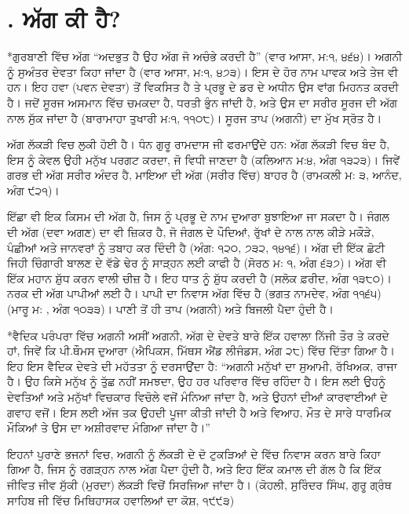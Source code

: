 \documentclass[12pt,a5paper,twoside]{book}  %
\makeatletter
\renewcommand\section{\@startsection{section}{1}{0pt}{1.2em}{0.6em}{\punjabifont\Large\bfseries}}%
\DeclareRobustCommand{\eng}[1]{{\rmfamily #1}}
\makeatother
\begin{document}
{\chapter*{\eng{3.} ਅੱਗ ਕੀ ਹੈ?}
\addcontentsline{toc}{chapter}{\eng{3.} ਅੱਗ ਕੀ ਹੈ?}
\section*{ਗੁਰਬਾਣੀ ਵਿੱਚ ਅੱਗ}
“ਅਦਭੁਤ ਹੈ ਉਹ ਅੱਗ ਜੋ ਅਚੰਭੇ ਕਰਦੀ ਹੈ” (ਵਾਰ ਆਸਾ, ਮ:੧, ੪੬੪)। ਅਗਨੀ ਨੂੰ ਸੁਅੰਤਰ ਦੇਵਤਾ ਕਿਹਾ ਜਾਂਦਾ ਹੈ (ਵਾਰ ਆਸਾ, ਮ:੧, ੪੭੩)। ਇਸ ਦੇ ਹੋਰ ਨਾਮ ਪਾਵਕ ਅਤੇ ਤੇਜ ਵੀ ਹਨ। ਇਹ ਹਵਾ (ਪਵਨ ਦੇਵਤਾ) ਤੋਂ ਵਿਕਸਿਤ ਹੈ ਤੇ ਪ੍ਰਭੂ ਦੇ ਡਰ ਦੇ ਅਧੀਨ ਉਸ ਵਾਂਗ ਮਿਹਨਤ ਕਰਦੀ ਹੈ। ਜਦੋਂ ਸੂਰਜ ਅਸਮਾਨ ਵਿੱਚ ਚਮਕਦਾ ਹੈ, ਧਰਤੀ ਭੁੰਨ ਜਾਂਦੀ ਹੈ, ਅਤੇ ਉਸ ਦਾ ਸਰੀਰ ਸੂਰਜ ਦੀ ਅੱਗ ਨਾਲ ਸੁੱਕ ਜਾਂਦਾ ਹੈ (ਬਾਰਾਮਾਹਾ ਤੁਖਾਰੀ ਮ:੧, ੧੧੦੮)। ਸੂਰਜ ਤਾਪ (ਅਗਨੀ) ਦਾ ਮੁੱਖ ਸ੍ਰੋਤ ਹੈ।

ਅੱਗ ਲੱਕੜੀ ਵਿਚ ਲੁਕੀ ਹੋਈ ਹੈ। ਧੰਨ ਗੁਰੂ ਰਾਮਦਾਸ ਜੀ ਫਰਮਾਉਂਦੇ ਹਨ: ਅੱਗ ਲੱਕੜੀ ਵਿਚ ਬੰਦ ਹੈ, ਇਸ ਨੂੰ ਕੇਵਲ ਉਹੀ ਮਨੁੱਖ ਪਰਗਟ ਕਰਦਾ, ਜੋ ਵਿਧੀ ਜਾਣਦਾ ਹੈ (ਕਲਿਆਨ ਮ:੪, ਅੰਗ ੧੩੨੩)। ਜਿਵੇਂ ਗਰਭ ਦੀ ਅੱਗ ਸਰੀਰ ਅੰਦਰ ਹੈ, ਮਾਇਆ ਦੀ ਅੱਗ (ਸਰੀਰ ਵਿੱਚ) ਬਾਹਰ ਹੈ (ਰਾਮਕਲੀ ਮ: ੩, ਆਨੰਦ, ਅੰਗ ੯੨੧)।

ਇੱਛਾ ਵੀ ਇਕ ਕਿਸਮ ਦੀ ਅੱਗ ਹੈ, ਜਿਸ ਨੂੰ ਪ੍ਰਭੂ ਦੇ ਨਾਮ ਦੁਆਰਾ ਬੁਝਾਇਆ ਜਾ ਸਕਦਾ ਹੈ। ਜੰਗਲ ਦੀ ਅੱਗ (ਦਵਾ ਅਗਣ) ਦਾ ਵੀ ਜ਼ਿਕਰ ਹੈ, ਜੋ ਜੰਗਲ ਦੇ ਪੌਦਿਆਂ, ਰੁੱਖਾਂ ਦੇ ਨਾਲ ਨਾਲ ਕੀੜੇ ਮਕੌੜੇ, ਪੰਛੀਆਂ ਅਤੇ ਜਾਨਵਰਾਂ ਨੂੰ ਤਬਾਹ ਕਰ ਦਿੰਦੀ ਹੈ (ਅੰਗ: ੧੨੦, ੭੩੨, ੧੪੧੬)। ਅੱਗ ਦੀ ਇੱਕ ਛੋਟੀ ਜਿਹੀ ਚਿੰਗਾਰੀ ਬਾਲਣ ਦੇ ਵੱਡੇ ਢੇਰ ਨੂੰ ਸਾੜ੍ਹਨ ਲਈ ਕਾਫੀ ਹੈ (ਸੋਰਠ ਮ: ੧, ਅੰਗ ੬੩੭)। ਅੱਗ ਵੀ ਇੱਕ ਮਹਾਨ ਸ਼ੁੱਧ ਕਰਨ ਵਾਲੀ ਚੀਜ਼ ਹੈ। ਇਹ ਧਾਤ ਨੂੰ ਸ਼ੁੱਧ ਕਰਦੀ ਹੈ (ਸਲੋਕ ਫ਼ਰੀਦ, ਅੰਗ ੧੩੮੦)। ਨਰਕ ਦੀ ਅੱਗ ਪਾਪੀਆਂ ਲਈ ਹੈ। ਪਾਪੀ ਦਾ ਨਿਵਾਸ ਅੱਗ ਵਿੱਚ ਹੈ (ਭਗਤ ਨਾਮਦੇਵ, ਅੰਗ ੧੧੬੫) (ਮਾਰੂ ਮ: \eng{1}, ਅੰਗ ੧੦੩੩)। ਪਾਣੀ ਤੋਂ ਹੀ ਤਾਪ (ਅਗਨੀ) ਅਤੇ ਬਿਜਲੀ ਪੈਦਾ ਹੁੰਦੀ ਹੈ।

\section*{ਵੈਦਿਕ ਪਰੰਪਰਾ ਵਿੱਚ ਅਗਨੀ}
ਅਸੀਂ ਅਗਨੀ, ਅੱਗ ਦੇ ਦੇਵਤੇ ਬਾਰੇ ਇੱਕ ਹਵਾਲਾ ਨਿੱਜੀ ਤੌਰ ਤੇ ਕਰਦੇ ਹਾਂ, ਜਿਵੇਂ ਕਿ ਪੀ.ਥੌਮਸ ਦੁਆਰਾ (ਐਪਿਕਸ, ਮਿੱਥਸ ਐਂਡ ਲੀਜੰਡਸ, ਅੰਗ ੨੮) ਵਿੱਚ ਦਿੱਤਾ ਗਿਆ ਹੈ। ਇਹ ਇਸ ਵੈਦਿਕ ਦੇਵਤੇ ਦੀ ਮਹੱਤਤਾ ਨੂੰ ਦਰਸਾਉਂਦਾ ਹੈ: “ਅਗਨੀ ਮਨੁੱਖਾਂ ਦਾ ਸੁਆਮੀ, ਰੱਖਿਅਕ, ਰਾਜਾ ਹੈ। ਉਹ ਕਿਸੇ ਮਨੁੱਖ ਨੂੰ ਤੁੱਛ ਨਹੀਂ ਸਮਝਦਾ, ਉਹ ਹਰ ਪਰਿਵਾਰ ਵਿੱਚ ਰਹਿੰਦਾ ਹੈ। ਇਸ ਲਈ ਉਹਨੂੰ ਦੇਵਤਿਆਂ ਅਤੇ ਮਨੁੱਖਾਂ ਵਿਚਕਾਰ ਵਿਚੋਲੇ ਵਜੋਂ ਮੰਨਿਆ ਜਾਂਦਾ ਹੈ, ਅਤੇ ਉਹਨਾਂ ਦੀਆਂ ਕਾਰਵਾਈਆਂ ਦੇ ਗਵਾਹ ਵਜੋਂ। ਇਸ ਲਈ ਅੱਜ ਤਕ ਉਹਦੀ ਪੂਜਾ ਕੀਤੀ ਜਾਂਦੀ ਹੈ ਅਤੇ ਵਿਆਹ, ਮੌਤ ਦੇ ਸਾਰੇ ਧਾਰਮਿਕ ਮੌਕਿਆਂ ਤੇ ਉਸ ਦਾ ਅਸ਼ੀਰਵਾਦ ਮੰਗਿਆ ਜਾਂਦਾ ਹੈ।”

ਇਹਨਾਂ ਪੁਰਾਣੇ ਭਜਨਾਂ ਵਿਚ, ਅਗਨੀ ਨੂੰ ਲੱਕੜੀ ਦੇ ਦੋ ਟੁਕੜਿਆਂ ਦੇ ਵਿੱਚ ਨਿਵਾਸ ਕਰਨ ਬਾਰੇ ਕਿਹਾ ਗਿਆ ਹੈ, ਜਿਸ ਨੂੰ ਰਗੜ੍ਹਨ ਨਾਲ ਅੱਗ ਪੈਦਾ ਹੁੰਦੀ ਹੈ, ਅਤੇ ਇਹ ਇੱਕ ਕਮਾਲ ਦੀ ਗੱਲ ਹੈ ਕਿ ਇੱਕ ਜੀਵਿਤ ਜੀਵ ਸੁੱਕੀ (ਮੁਰਦਾ) ਲੱਕੜੀ ਵਿਚੋਂ ਸਿਰਜਿਆ ਜਾਂਦਾ ਹੈ। (ਕੋਹਲੀ, ਸੁਰਿੰਦਰ ਸਿੰਘ, ਗੁਰੂ ਗ੍ਰੰਥ ਸਾਹਿਬ ਜੀ ਵਿੱਚ ਮਿਥਿਹਾਸਕ ਹਵਾਲਿਆਂ ਦਾ ਕੋਸ਼, ੧੯੯੩)

}
\end{document}
